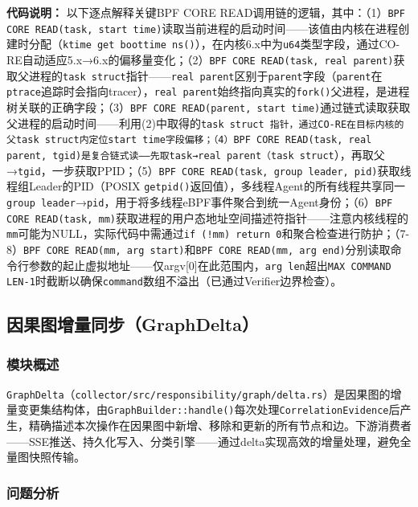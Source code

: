 \documentclass[a4paper]{ctexart}
\makeatletter
\renewcommand{\_}{%
  \ifmmode
    \nfss@text{\textunderscore}%
  \else
    \textunderscore\discretionary{}{}{}%
  \fi}
\makeatother
\begin{document}
\textbf{代码说明：} 以下逐点解释关键BPF\_CORE\_READ调用链的逻辑，其中：（1）\texttt{BPF\_CORE\_READ(task, start\_time)}读取当前进程的启动时间——该值由内核在进程创建时分配（\texttt{ktime\_get\_boottime\_ns()}），在内核6.x中为\texttt{u64}类型字段，通过CO-RE自动适应5.x→6.x的偏移量变化；（2）\texttt{BPF\_CORE\_READ(task, real\_parent)}获取父进程的\texttt{task\_struct}指针——\texttt{real\_parent}区别于\texttt{parent}字段（\texttt{parent}在\texttt{ptrace}追踪时会指向tracer），\texttt{real\_parent}始终指向真实的\texttt{fork()}父进程，是进程树关联的正确字段；（3）\texttt{BPF\_CORE\_READ(parent, start\_time)}通过链式读取获取父进程的启动时间——利用(2)中取得的\texttt{task\_struct \textit{}指针，通过CO-RE在目标内核的父\texttt{task\_struct}内定位\texttt{start\_time}字段偏移；（4）\texttt{BPF\_CORE\_READ(task, real\_parent, tgid)}是复合链式读——先取\texttt{task→real\_parent}（task\_struct}），再取父→\texttt{tgid}，一步获取PPID；（5）\texttt{BPF\_CORE\_READ(task, group\_leader, pid)}获取线程组Leader的PID（POSIX \texttt{getpid()}返回值），多线程Agent的所有线程共享同一\texttt{group\_leader}→\texttt{pid}，用于将多线程eBPF事件聚合到统一Agent身份；（6）\texttt{BPF\_CORE\_READ(task, mm)}获取进程的用户态地址空间描述符指针——注意内核线程的\texttt{mm}可能为NULL，实际代码中需通过\texttt{if (!mm) return 0}和聚合检查进行防护；（7-8）\texttt{BPF\_CORE\_READ(mm, arg\_start)}和\texttt{BPF\_CORE\_READ(mm, arg\_end)}分别读取命令行参数的起止虚拟地址——仅argv[0]在此范围内，\texttt{arg\_len}超出\texttt{MAX\_COMMAND\_LEN-1}时截断以确保\texttt{command}数组不溢出（已通过Verifier边界检查）。


\subsection{因果图增量同步（GraphDelta）}



\subsubsection{模块概述}



\texttt{GraphDelta}（\texttt{collector/src/responsibility/graph/delta.rs}）是因果图的增量变更集结构体，由\texttt{GraphBuilder::handle()}每次处理\texttt{CorrelationEvidence}后产生，精确描述本次操作在因果图中新增、移除和更新的所有节点和边。下游消费者——SSE推送、持久化写入、分类引擎——通过delta实现高效的增量处理，避免全量图快照传输。


\subsubsection{问题分析}
\end{document}
